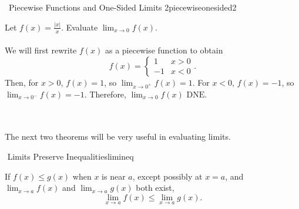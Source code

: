        \begin{example}{\Difficulty\,\Difficulty\,\,Piecewise Functions and One-Sided Limits 2}{piecewiseonesided2}

            Let \(f(x)=\frac{|x|}{x}\). Evaluate \(\lim_{x \to 0}f(x)\).
            \\
            \\
            We will first rewrite \(f(x)\) as a piecewise function to obtain
            \begin{equation*}
                f(x)=\begin{cases} 1 & x>0 \\ -1 & x<0 \end{cases}.
            \end{equation*}
            Then, for \(x>0\), \(f(x)=1\), so \(\lim_{x\to 0^+}f(x)=1\). For \(x<0\), \(f(x)=-1\), so \(\lim_{x\to 0^-}f(x)=-1\). Therefore, \(\lim_{x\to 0}f(x)\text{ DNE}\).
            
        \end{example}
        \vphantom
        \\
        \\
        The next two theorems will be very useful in evaluating limits.
        \begin{theorem}{\Stop\,\,Limits Preserve Inequalities}{limineq}

            If \(f(x)\leq g(x)\) when \(x\) is near \(a\), except possibly at \(x=a\), and \(\lim_{x\to a}f(x)\) and \(\lim_{x\to a}g(x)\) both exist,
            \begin{equation*}
                \lim_{x\to a}f(x)\leq\lim_{x\to a}g(x).
            \end{equation*}
            
        \end{theorem}
        \pagebreak

